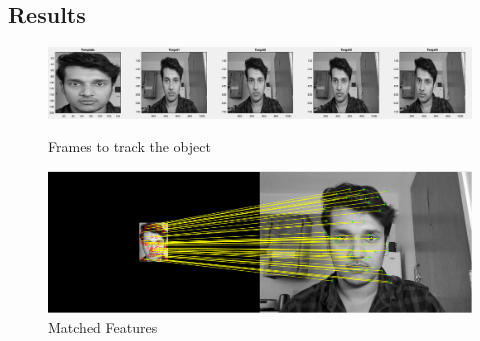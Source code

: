 \documentclass[letter, 10pt]{article}
\begin{document}
\subsection*{Results}
\begin{figure}[h]
        \centering
        \includegraphics[width=\textwidth]{HW2/RESULT/FRAMES.png}
        \caption{Frames to track the object}
    \endminipage\hfill
        \centering
        \includegraphics[width=\textwidth]{HW2/RESULT/MATCHED_FEATURES.png}
        \caption{Matched Features}
    \endminipage\hfill
\end{figure}
\end{document}
